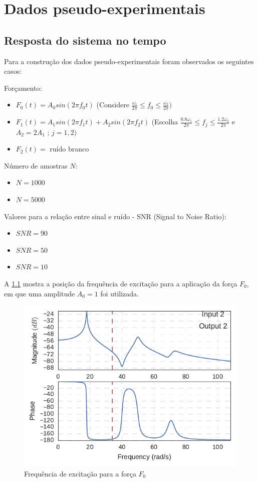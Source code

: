 \chapter{Dados pseudo-experimentais}

\section{Resposta do sistema no tempo}

Para a construção dos dados pseudo-experimentais foram observados os seguintes casos:

Forçamento:
\begin{itemize}
	\item $F_0(t) = A_0 sin(2\pi f_0 t)$ 
	(Considere $\frac{\omega_1}{2\pi} \leq f_0 \leq \frac{\omega_2}{2\pi})$ 
	\item $F_1(t) = A_1 sin(2\pi f_1 t) + A_2 sin(2\pi f_2 t)$ 
	(Escolha 
	$\frac{0.8 \omega_1}{2\pi} \leq f_j \leq \frac{1.2 \omega_2}{2\pi}$ 
	e
	$A_2 = 2A_1$
	;
	$ j = 1, 2)$
	\item $F_2(t) = $ ruído branco
\end{itemize}

Número de amostras $N$:
\begin{itemize}
	\item $N = 1000$
	\item $N = 5000$
\end{itemize}

Valores para a relação entre sinal e ruído -  SNR (Signal to Noise Ratio):
\begin{itemize}
	\item $SNR = 90$
	\item $SNR = 50$
	\item $SNR = 10$
\end{itemize}

A \cref{fig:FRF_i2_o2_freq34} mostra a posição da frequência de excitação para a aplicação da força $F_0$, em que uma amplitude $A_0 = 1$ foi utilizada.

\begin{figure}
	\centering
	\includegraphics[scale=1]{IMGS/FRF_i2_o2_freq34.pdf}
	\caption{Frequência de excitação para a força $F_0$}
	\label{fig:FRF_i2_o2_freq34}
\end{figure}

